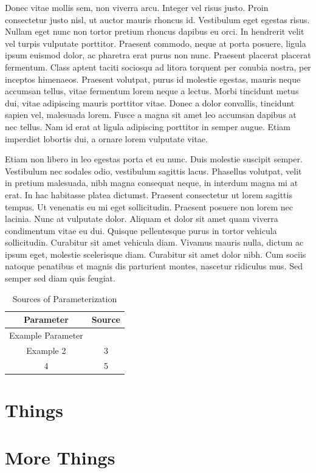 \documentclass[double,12pt]{beavtex}
\begin{document}
Donec vitae mollis sem, non viverra arcu. Integer vel risus justo. Proin consectetur justo nisl, ut auctor mauris rhoncus id. Vestibulum eget egestas risus. Nullam eget nunc non tortor pretium rhoncus dapibus eu orci. In hendrerit velit vel turpis vulputate porttitor. Praesent commodo, neque at porta posuere, ligula ipsum euismod dolor, ac pharetra erat purus non nunc. Praesent placerat placerat fermentum. Class aptent taciti sociosqu ad litora torquent per conubia nostra, per inceptos himenaeos. Praesent volutpat, purus id molestie egestas, mauris neque accumsan tellus, vitae fermentum lorem neque a lectus. Morbi tincidunt metus dui, vitae adipiscing mauris porttitor vitae. Donec a dolor convallis, tincidunt sapien vel, malesuada lorem. Fusce a magna sit amet leo accumsan dapibus at nec tellus. Nam id erat at ligula adipiscing porttitor in semper augue. Etiam imperdiet lobortis dui, a ornare lorem vulputate vitae. 

Etiam non libero in leo egestas porta et eu nunc. Duis molestie suscipit semper. Vestibulum nec sodales odio, vestibulum sagittis lacus. Phasellus volutpat, velit in pretium malesuada, nibh magna consequat neque, in interdum magna mi at erat. In hac habitasse platea dictumst. Praesent consectetur ut lorem sagittis tempus. Ut venenatis eu mi eget sollicitudin. Praesent posuere non lorem nec lacinia. Nunc at vulputate dolor. Aliquam et dolor sit amet quam viverra condimentum vitae eu dui. Quisque pellentesque purus in tortor vehicula sollicitudin. Curabitur sit amet vehicula diam. Vivamus mauris nulla, dictum ac ipsum eget, molestie scelerisque diam. Curabitur sit amet dolor nibh. Cum sociis natoque penatibus et magnis dis parturient montes, nascetur ridiculus mus. Sed semper sed diam quis feugiat. 

\pagebreak




\pagebreak

\appendix

\begin{table}[ht]
\centering
\caption{Sources of Parameterization}
\begin{tabular}[t]{cc}
\toprule
Parameter&Source\\
\midrule
Example Parameter& \cite{bockheimNutrientDynamicsDecomposing2011}\\
Example 2&3\\
4&5\\
\bottomrule
\end{tabular}
\end{table}%

\chapter{Things}





\chapter{More Things}
\end{document}
